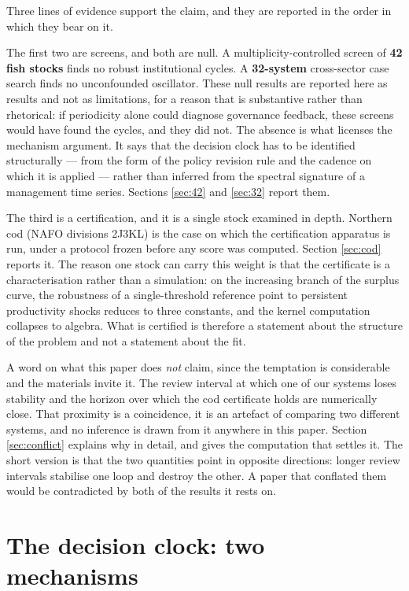 Three lines of evidence support the claim, and they are reported in the order in which
they bear on it.

The first two are screens, and both are null. A multiplicity-controlled screen of
\textbf{42 fish stocks} finds no robust institutional cycles. A \textbf{32-system}
cross-sector case search finds no unconfounded oscillator. These null results are reported
here as results and not as limitations, for a reason that is substantive rather than
rhetorical: if periodicity alone could diagnose governance feedback, these screens would
have found the cycles, and they did not. The absence is what licenses the mechanism
argument. It says that the decision clock has to be identified structurally --- from the
form of the policy revision rule and the cadence on which it is applied --- rather than
inferred from the spectral signature of a management time series. Sections
\ref{sec:42} and \ref{sec:32} report them.

The third is a certification, and it is a single stock examined in depth. Northern cod
(NAFO divisions 2J3KL) is the case on which the certification apparatus is run, under a
protocol frozen before any score was computed. Section \ref{sec:cod} reports it. The
reason one stock can carry this weight is that the certificate is a characterisation
rather than a simulation: on the increasing branch of the surplus curve, the robustness of
a single-threshold reference point to persistent productivity shocks reduces to three
constants, and the kernel computation collapses to algebra. What is certified is therefore
a statement about the structure of the problem and not a statement about the fit.

A word on what this paper does \emph{not} claim, since the temptation is considerable and
the materials invite it. The review interval at which one of our systems loses stability
and the horizon over which the cod certificate holds are numerically close. That proximity
is a coincidence, it is an artefact of comparing two different systems, and no inference
is drawn from it anywhere in this paper. Section \ref{sec:conflict} explains why in
detail, and gives the computation that settles it. The short version is that the two
quantities point in opposite directions: longer review intervals stabilise one loop and
destroy the other. A paper that conflated them would be contradicted by both of the
results it rests on.

\section{The decision clock: two mechanisms}
\label{sec:clock}

